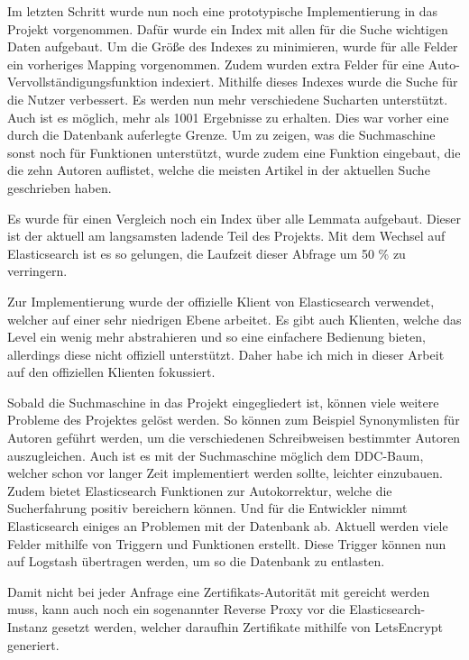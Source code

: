 Im letzten Schritt wurde nun noch eine prototypische Implementierung in das Projekt vorgenommen. Dafür wurde ein Index mit allen für die Suche wichtigen Daten aufgebaut. Um die Größe des Indexes zu minimieren, wurde für alle Felder ein vorheriges Mapping vorgenommen. Zudem wurden extra Felder für eine Auto-Vervollständigungsfunktion indexiert. Mithilfe dieses Indexes wurde die Suche für die Nutzer verbessert. Es werden nun mehr verschiedene Sucharten unterstützt. Auch ist es möglich, mehr als 1001 Ergebnisse zu erhalten. Dies war vorher eine durch die Datenbank auferlegte Grenze. Um zu zeigen, was die Suchmaschine sonst noch für Funktionen unterstützt, wurde zudem eine Funktion eingebaut, die die zehn Autoren auflistet, welche die meisten Artikel in der aktuellen Suche geschrieben haben. 

Es wurde für einen Vergleich noch ein Index über alle Lemmata aufgebaut. Dieser ist der aktuell am langsamsten ladende Teil des Projekts. Mit dem Wechsel auf Elasticsearch ist es so gelungen, die Laufzeit dieser Abfrage um 50 \% zu verringern. 

Zur Implementierung wurde der offizielle Klient von Elasticsearch verwendet, welcher auf einer sehr niedrigen Ebene arbeitet. Es gibt auch Klienten, welche das Level ein wenig mehr abstrahieren und so eine einfachere Bedienung bieten, allerdings diese nicht offiziell unterstützt. Daher habe ich mich in dieser Arbeit auf den offiziellen Klienten fokussiert. 

Sobald die Suchmaschine in das Projekt eingegliedert ist, können viele weitere Probleme des Projektes gelöst werden. So können zum Beispiel Synonymlisten für Autoren geführt werden, um die verschiedenen Schreibweisen bestimmter Autoren auszugleichen. Auch ist es mit der Suchmaschine möglich dem DDC-Baum, welcher schon vor langer Zeit implementiert werden sollte, leichter einzubauen. Zudem bietet Elasticsearch Funktionen zur Autokorrektur, welche die Sucherfahrung positiv bereichern können. Und für die Entwickler nimmt Elasticsearch einiges an Problemen mit der Datenbank ab. Aktuell werden viele Felder mithilfe von Triggern und Funktionen erstellt. Diese Trigger können nun auf Logstash übertragen werden, um so die Datenbank zu entlasten.

Damit nicht bei jeder Anfrage eine Zertifikats-Autorität mit gereicht werden muss, kann auch noch ein sogenannter Reverse Proxy vor die Elasticsearch-Instanz gesetzt werden, welcher daraufhin Zertifikate mithilfe von LetsEncrypt generiert.